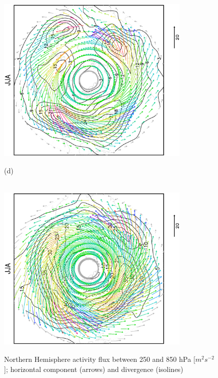 \documentclass[12pt,a4paper,twoside,openright,headinclude,liststotoc,bibtotoc]{scrreprt}
\begin{document}
\begin{figure}[b]
{\includegraphics[height=8.0cm,angle=-90]
{eps/north_JJA_PFLX_TMEAN1.eps}
}
\parbox{8.5cm}{\hspace{0.95cm}\begin{scriptsize}(d)\end{scriptsize} \vspace{-0.5cm} \\
\includegraphics[height=8.0cm,angle=-90]
{eps/dailyERA_north_JJA_PFLX_TMEAN.eps}
}
\caption[Activity flux-Northern Hemisphere]{Northern Hemisphere activity flux between 250 and 850 hPa [$m^{2}s^{-2}$]; horizontal component (arrows) and divergence (isolines)}
\label{img:plumbnorth}
\end{figure}
\end{document}
